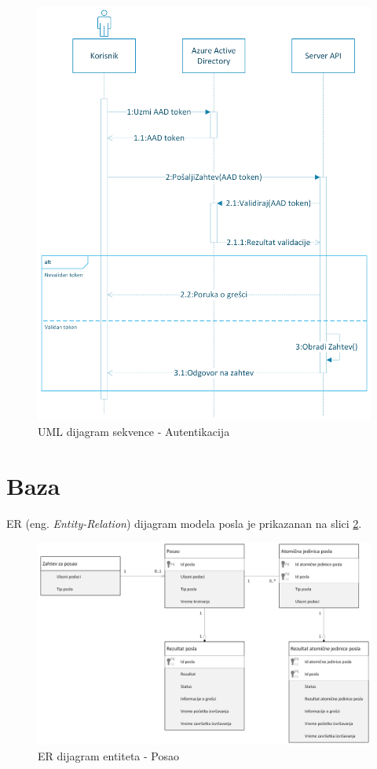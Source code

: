 \documentclass[12pt,oneside]{memoir}
\begin{document}
\begin{figure}[!ht]
  \centering
  \label{fig:autentikacija}
  \includegraphics[width=1.0\textwidth]{./images/autentikacija_uml_dijagram_sekvence.png}
  \caption{UML dijagram sekvence - Autentikacija}
\end{figure}


\section{Baza}

ER (eng. \emph{Entity-Relation}) dijagram modela posla je prikazanan na slici \ref{fig:erposao}.

\begin{figure}[!ht]
  \centering
  \label{fig:erposao}
  \includegraphics[width=1.0\textwidth]{./images/uml_er_dijagram_posao.png}
  \caption{ER dijagram entiteta - Posao}
\end{figure}
\end{document}
